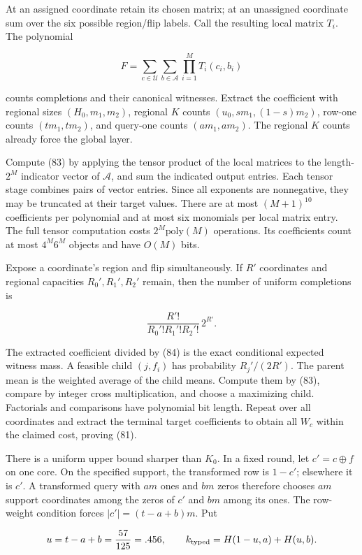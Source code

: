 At an assigned coordinate retain its chosen matrix; at an unassigned coordinate sum over the six possible region/flip labels. Call the resulting local matrix \(T_i\). The polynomial

\[
F=\sum_{c\in\mathcal U}\sum_{b\in\mathcal A}
\prod_{i=1}^M T_i(c_i,b_i)
\tag{83}
\]

counts completions and their canonical witnesses. Extract the coefficient with regional sizes \((H_0,m_1,m_2)\), regional \(K\) counts \((u_0,sm_1,(1-s)m_2)\), row-one counts \((tm_1,tm_2)\), and query-one counts \((am_1,am_2)\). The regional \(K\) counts already force the global layer.

Compute (83) by applying the tensor product of the local matrices to the length-\(2^M\) indicator vector of \(\mathcal A\), and sum the indicated output entries. Each tensor stage combines pairs of vector entries. Since all exponents are nonnegative, they may be truncated at their target values. There are at most \((M+1)^{10}\) coefficients per polynomial and at most six monomials per local matrix entry. The full tensor computation costs \(2^M\mathrm{poly}(M)\) operations. Its coefficients count at most \(4^M6^M\) objects and have \(O(M)\) bits.

Expose a coordinate's region and flip simultaneously. If \(R'\) coordinates and regional capacities \(R_0',R_1',R_2'\) remain, then the number of uniform completions is

\[
\frac{R'!}{R_0'!R_1'!R_2'!}\,2^{R'}.
\tag{84}
\]

The extracted coefficient divided by (84) is the exact conditional expected witness mass. A feasible child \((j,f_i)\) has probability \(R_j'/(2R')\). The parent mean is the weighted average of the child means. Compute them by (83), compare by integer cross multiplication, and choose a maximizing child. Factorials and comparisons have polynomial bit length. Repeat over all coordinates and extract the terminal target coefficients to obtain all \(W_c\) within the claimed cost, proving (81).

There is a uniform upper bound sharper than \(K_0\). In a fixed round, let \(c'=c\oplus f\) on one core. On the specified support, the transformed row is \(1-c'\); elsewhere it is \(c'\). A transformed query with \(am\) ones and \(bm\) zeros therefore chooses \(am\) support coordinates among the zeros of \(c'\) and \(bm\) among its ones. The row-weight condition forces \(|c'|=(t-a+b)m\). Put

\[
u=t-a+b=\frac{57}{125}=.456,
\qquad k_{\rm typed}=H(1-u,a)+H(u,b).
\]

